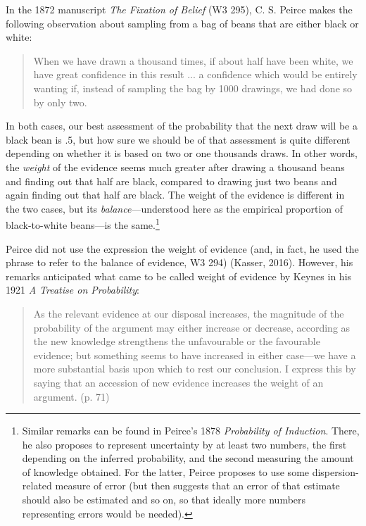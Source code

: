 \documentclass[
  10pt,
  dvipsnames,enabledeprecatedfontcommands]{scrartcl}
\begin{document}
In the 1872 manuscript \emph{The Fixation of Belief} (W3 295), C. S.
Peirce makes the following observation about sampling from a bag of
beans that are either black or white:

\begin{quote} When we have drawn a thousand times, if about half have been white, we have great confidence in this result ... a confidence which would be entirely wanting if, instead of sampling the bag by 1000 drawings, we had done so by only two.
\end{quote}

\noindent In both cases, our best assessment of the probability that the
next draw will be a black bean is .5, but how sure we should be of that
assessment is quite different depending on whether it is based on two or
one thousands draws. In other words, the \emph{weight} of the evidence
seems much greater after drawing a thousand beans and finding out that
half are black, compared to drawing just two beans and again finding out
that half are black. The weight of the evidence is different in the two
cases, but its \emph{balance}---understood here as the empirical
proportion of black-to-white beans---is the same.\footnote{Similar
  remarks can be found in Peirce's 1878 \emph{Probability of Induction}.
  There, he also proposes to represent uncertainty by at least two
  numbers, the first depending on the inferred probability, and the
  second measuring the amount of knowledge obtained. For the latter,
  Peirce proposes to use some dispersion-related measure of error (but
  then suggests that an error of that estimate should also be estimated
  and so on, so that ideally more numbers representing errors would be
  needed).}

Peirce did not use the expression the weight of evidence (and, in fact,
he used the phrase to refer to the balance of evidence, W3 294) (Kasser,
2016). However, his remarks anticipated what came to be called weight of
evidence by Keynes in his 1921 \emph{A Treatise on Probability}:

\begin{quote}
As the relevant evidence at our disposal increases, the magnitude of the
probability of the argument may either increase or decrease, according as the new knowledge strengthens the unfavourable or the favourable evidence; but something seems to have increased in either case---we have a more substantial basis upon which to rest our conclusion. I express this by saying that an accession of new evidence increases the weight of an argument. (p. 71)
\end{quote}
\end{document}
